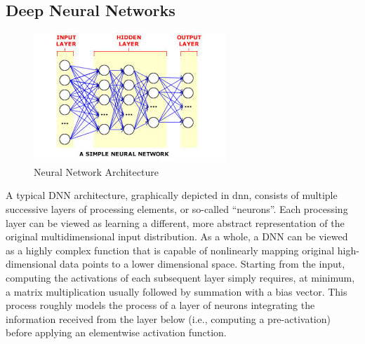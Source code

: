 \documentclass{article}
\begin{document}
	\subsection{Deep Neural Networks}
	\begin{figure}[h!]
		\centering
		\includegraphics[width=0.9\columnwidth]{dnn}
		\caption{Neural Network Architecture}
		\label{fig:dnn}
	\end{figure}
	A typical DNN architecture, graphically depicted in \figurename{dnn}, consists of multiple successive
	layers of processing elements, or so-called “neurons”. Each processing layer can be viewed
	as learning a different, more abstract representation of the original multidimensional input
	distribution. As a whole, a DNN can be viewed as a highly complex function that is capable
	of nonlinearly mapping original high-dimensional data points to a lower dimensional space.
	Starting from the input, computing the activations of each subsequent layer simply requires,
	at minimum, a matrix multiplication usually followed by summation with a bias vector.
	This process roughly models the process of a layer of neurons integrating the information
	received from the layer below (i.e., computing a pre-activation) before applying an
	elementwise activation function.
	
\end{document}
